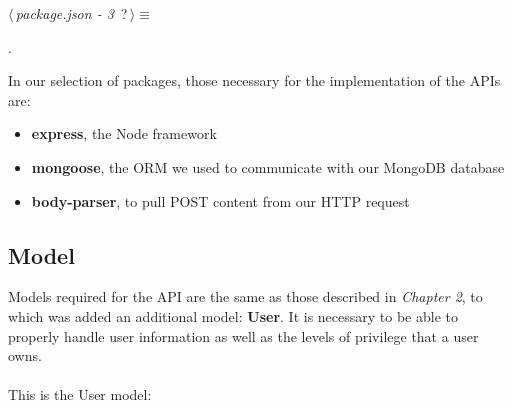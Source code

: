 \begin{flushleft} \small
\begin{minipage}{\linewidth}\label{scrap3}\raggedright\small
{} $\langle\,${\itshape {package.json - 3}}\nobreak\ {\footnotesize {?}}$\,\rangle\equiv$
\vspace{-1ex}
\begin{list}{}{} \item

                
        {\NWsep}
\end{list}
\vspace{-1.5ex}
\footnotesize
\begin{list}{}{\setlength{\itemsep}{-\parsep}\setlength{\itemindent}{-\leftmargin}}
\item {\NWtxtMacroNoRef}.

\item{}
\end{list}
\end{minipage}\vspace{4ex}
\end{flushleft}
In our selection of packages, those necessary for the implementation of the APIs are:

\begin{itemize}
	\item \textbf{express}, the Node framework
	\item \textbf{mongoose}, the ORM we used to communicate with our MongoDB database
	\item \textbf{body-parser}, to pull POST content from our HTTP request
\end{itemize}

\subsection{Model}

Models required for the API are the same as those described in \emph{Chapter 2}, to which was added an additional model: \textbf{User}. It is necessary to be able to properly handle user information as well as the levels of privilege that a user owns. 
\\
\\This is the User model:

